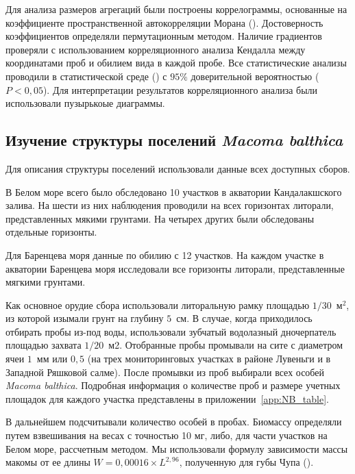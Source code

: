 Для анализа размеров агрегаций были построены коррелограммы, основанные на коэффициенте пространственной автокорреляции Морана (\cite{ncf}).
Достоверность коэффициентов определяли пермутационным методом.
Наличие градиентов проверяли с использованием корреляционного анализа Кендалла между координатами проб и обилием вида в каждой пробе. 
Все статистические анализы проводили в статистической среде \R{} (\cite{R_2014}) с $95\%$ доверительной вероятностью ($P < 0,05$).
Для интерпретации результатов корреляционного анализа были использовали пузырькоые диаграммы.

	
	\subsection{Изучение структуры поселений {\it Macoma balthica}}
Для описания структуры поселений использовали данные всех доступных сборов.

В Белом море всего было обследовано 10 участков в акватории Кандалакшского залива. 
На шести из них наблюдения проводили на всех горизонтах литорали, представленных мякими грунтами.
На четырех других были обследованы отдельные горизонты. 

Для Баренцева моря данные по обилию с 12 участков. На каждом участке в акватории Баренцева моря исследовали все  горизонты литорали, представленные мягкими грунтами.  

Как основное орудие сбора использовали литоральную рамку площадью $1/30$~м$^2$, из которой изымали грунт на глубину $5$~см. 
В случае, когда приходилось отбирать пробы из-под воды, использовали зубчатый водолазный дночерпатель площадью захвата $1/20$~м2.
Отобранные пробы промывали на сите с диаметром ячеи $1$~мм или $0,5$ (на трех мониторинговых участках в районе Лувеньги и в Западной Ряшковой салме). 
После промывки из   проб   выбирали   всех   особей  {\it Macoma balthica}.
Подробная информация о количестве проб и размере учетных площадок для каждого участка представлены в приложении~\ref{app:NB_table}.

В дальнейшем подсчитывали количество особей в пробах. 
Биомассу определяли путем взвешивания на весах с точностью 10 мг, либо, для части участков на Белом море, рассчетным методом.
Мы использовали формулу зависимости массы макомы от ее длины $W = 0,00016 \times L^{2,96}$, полученную для губы Чупа (\cite{Maximovich_et_al_1993}).

